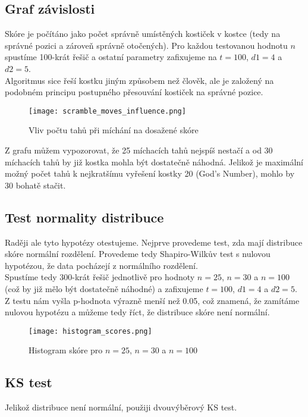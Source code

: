 \documentclass{article}
\begin{document}
\subsection*{Graf závislosti}
Skóre je počítáno jako počet správně umístěných kostiček v kostce (tedy na správné pozici a zároveň správně otočených).
Pro každou testovanou hodnotu $n$ spustíme 100-krát řešič a ostatní parametry zafixujeme na
$t = 100$, $d1 = 4$ a $d2 = 5$.\\
Algoritmus sice řeší kostku jiným způsobem než člověk, ale je založený na podobném principu 
postupného přesouvání kostiček na správné pozice.

\begin{figure}[h]
    \centering
    \texttt{[image: scramble\_moves\_influence.png]}
    \caption{Vliv počtu tahů při míchání na dosažené skóre}
    \label{fig:scramble_moves_influence}
\end{figure}

Z grafu můžem vypozorovat, že 25 míchacích tahů nejspíš nestačí a od 30 míchacích
tahů by již kostka mohla být dostatečně náhodná.
Jelikož je maximální možný počet tahů k nejkratšímu vyřešení kostky 20 (God's Number),
mohlo by 30 bohatě stačit.

\subsection*{Test normality distribuce}
Raději ale tyto hypotézy otestujeme. Nejprve provedeme test, zda mají distribuce skóre normální rozdělení.
Provedeme tedy Shapiro-Wilkův test s nulovou hypotézou, že data pocházejí z normálního rozdělení.\\
Spustíme tedy 300-krát řešič jednotlivě pro hodnoty $n = 25$, $n = 30$ a $n = 100$ (což by již mělo být dostatečně náhodné) a zafixujeme $t = 100$, $d1 = 4$ a $d2 = 5$.
Z testu nám vyšla p-hodnota výrazně menší než 0.05, což znamená, že zamítáme nulovou hypotézu a 
můžeme tedy říct, že distribuce skóre není normální.\\

\begin{figure}[h]
    \centering
    \texttt{[image: histogram\_scores.png]}
    \caption{Histogram skóre pro $n = 25$, $n = 30$ a $n = 100$}
    \label{fig:histogram_scores}
\end{figure}

\subsection*{KS test}
Jelikož distribuce není normální, použiji dvouvýběrový KS test.
\end{document}
